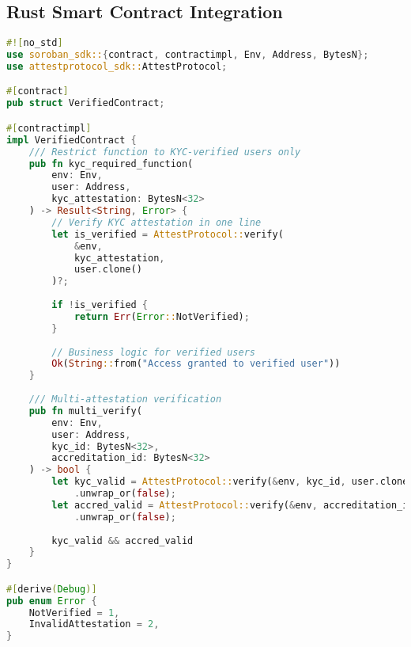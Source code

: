 \documentclass[11pt,a4paper]{article}
\begin{document}
\subsection{Rust Smart Contract Integration}

\begin{lstlisting}[language=Rust, caption={Soroban smart contract integration}]
#![no_std]
use soroban_sdk::{contract, contractimpl, Env, Address, BytesN};
use attestprotocol_sdk::AttestProtocol;

#[contract]
pub struct VerifiedContract;

#[contractimpl]
impl VerifiedContract {
    /// Restrict function to KYC-verified users only
    pub fn kyc_required_function(
        env: Env,
        user: Address,
        kyc_attestation: BytesN<32>
    ) -> Result<String, Error> {
        // Verify KYC attestation in one line
        let is_verified = AttestProtocol::verify(
            &env,
            kyc_attestation,
            user.clone()
        )?;
        
        if !is_verified {
            return Err(Error::NotVerified);
        }
        
        // Business logic for verified users
        Ok(String::from("Access granted to verified user"))
    }
    
    /// Multi-attestation verification
    pub fn multi_verify(
        env: Env,
        user: Address,
        kyc_id: BytesN<32>,
        accreditation_id: BytesN<32>
    ) -> bool {
        let kyc_valid = AttestProtocol::verify(&env, kyc_id, user.clone())
            .unwrap_or(false);
        let accred_valid = AttestProtocol::verify(&env, accreditation_id, user)
            .unwrap_or(false);
            
        kyc_valid && accred_valid
    }
}

#[derive(Debug)]
pub enum Error {
    NotVerified = 1,
    InvalidAttestation = 2,
}
\end{lstlisting}

\newpage
\printbibliography
\end{document}
